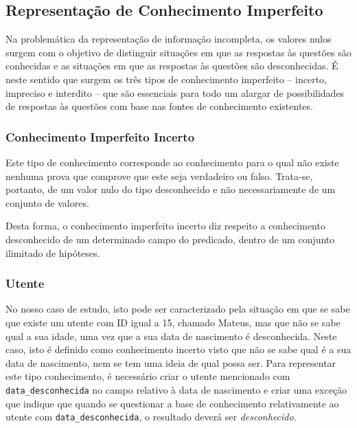 \documentclass[a4paper, 11pt]{article}
\begin{document}
\pagebreak

\subsection{Representação de Conhecimento Imperfeito}

Na problemática da representação de informação incompleta, os valores nulos
surgem com o objetivo de distinguir situações em que as respostas às questões são
conhecidas e as situações em que as respostas às questões são
desconhecidas. É neste sentido que surgem os três tipos de conhecimento imperfeito -- incerto, 
impreciso e interdito -- 
que são essenciais para todo um alargar de possibilidades de respostas às questões com base nas 
fontes de conhecimento existentes.


\subsubsection{Conhecimento Imperfeito Incerto}

Este tipo de conhecimento corresponde ao conhecimento para o qual não existe nenhuma prova que 
comprove que este seja verdadeiro ou falso. Trata-se, portanto, de um valor nulo do tipo 
desconhecido e não necessariamente de um conjunto de
valores. 

Desta forma, o conhecimento imperfeito incerto diz respeito a conhecimento desconhecido de
um determinado campo do predicado, dentro de um conjunto ilimitado de hipóteses.

\subsubsection*{Utente}

No nosso caso de estudo, isto pode ser caracterizado pela situação em que se sabe que
existe um utente com ID igual a 15, chamado Mateus, mas que não se sabe qual a sua idade, uma vez 
que a sua data de nascimento é desconhecida. Neste caso, isto é definido como conhecimento 
incerto visto que não se sabe qual é a sua data de nascimento, nem se tem uma ideia de qual possa 
ser. Para
representar este tipo conhecimento, é necessário criar o utente mencionado com
\texttt{data\_desconhecida} no campo relativo à data de nascimento e criar uma exceção que 
indique que quando se questionar a base de conhecimento relativamente ao utente com 
\texttt{data\_desconhecida}, o resultado deverá ser \textit{desconhecido}.

\
\end{document}
